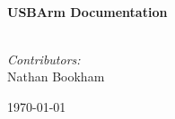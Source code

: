 \begin{titlepage}
\begin{center}
\HRule \\[0.4cm]
{ \huge \bfseries USBArm Documentation\\[0.4cm] }
\HRule \\[1.5cm]

\begin{minipage}{0.4\textwidth}
\begin{flushleft} \large
\emph{Contributors:}\\
Nathan Bookham
\end{flushleft}
\end{minipage}
\vfill

{\large \today}

\end{center}
\end{titlepage}
